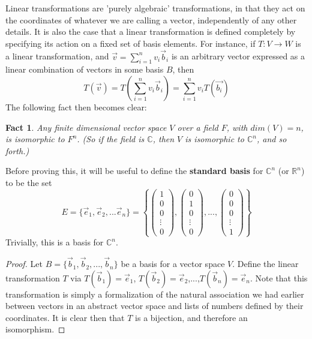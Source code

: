 \documentclass{article}
\theoremstyle{definition}
\theoremstyle{plain}
\theoremstyle{theorem}
\newtheorem{fact}{Fact}[section]
\begin{document}
Linear transformations are 'purely algebraic' transformations, in that they act on the coordinates of whatever we are calling a vector, independently of any other details. It is also the case that a linear transformation is defined completely by specifying its action on a fixed set of basis elements. For instance, if $T:V \to W$ is a linear transformation, and $\vec{v} = \sum_{i=1}^n v_i\vec{b}_i$ is an arbitrary vector expressed as a linear combination of vectors in some basis $B$, then 
\[ T(\vec{v}) = T\left(\sum_{i=1}^n v_i\vec{b}_i\right) = \sum_{i=1}^n v_i T(\vec{b_i}) \]
The following fact then becomes clear:
\begin{fact}
	Any finite dimensional vector space $V$ over a field $F$, with $dim(V) = n$, is isomorphic to $F^n$. (So if the field is $\mathbb{C}$, then $V$ is isomorphic to $\mathbb{C}^n$, and so forth.)
\end{fact}
Before proving this, it will be useful to define the \textbf{standard basis} for $\mathbb{C}^n$ (or $\mathbb{R}^n$) to be the set 
\[E = \{\vec{e}_1,\vec{e}_2,...\vec{e}_n\} = \left\{\begin{pmatrix} 1 \\ 0 \\ 0 \\ \vdots \\ 0 \end{pmatrix}, \begin{pmatrix} 0 \\ 1 \\ 0 \\ \vdots \\ 0 \end{pmatrix},..., \begin{pmatrix} 0 \\ 0 \\ 0 \\ \vdots \\ 1 \end{pmatrix} \right\}  \]
Trivially, this is a basis for $\mathbb{C}^n$.
\begin{proof}
	Let $B = \{\vec{b}_1,\vec{b}_2,...,\vec{b}_n\}$ be a basis for a vector space $V$. Define the linear transformation $T$ via $T(\vec{b}_1) = \vec{e}_1$, $T(\vec{b}_2) = \vec{e}_2$,...,$T(\vec{b}_n) = \vec{e}_n$. Note that this transformation is simply a formalization of the natural association we had earlier between vectors in an abstract vector space and lists of numbers defined by their coordinates. It is clear then that $T$ is a bijection, and therefore an isomorphism.  
\end{proof}
\end{document}
